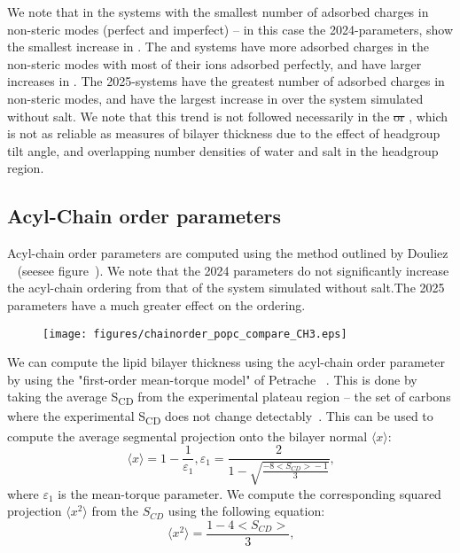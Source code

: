 We note that in the systems with the smallest number of adsorbed charges in non-steric modes (perfect and imperfect) -- in this case the 2024-\mg parameters, show
the smallest increase in \dc{}. The \na and \li systems have more adsorbed charges in the non-steric modes with most of their ions adsorbed perfectly,
and have larger increases in \dc{}. The 2025-\mg systems have the greatest number of adsorbed charges in non-steric modes, and have the largest increase in \dc{} over the system simulated without salt. We note that
this trend is not followed necessarily in the \dhh{} \st{or \db{}}, which is not as reliable as measures of bilayer thickness due to the effect of headgroup tilt angle, and overlapping number densities of water
and salt in the headgroup region.
\subsection{Acyl-Chain order parameters}
Acyl-chain order parameters are computed using the method outlined by Douliez \etal~\cite{Douliez:1995} (seesee  figure~\label{fig:acylorder}). We note that
the 2024 \mg{} parameters do not significantly increase the acyl-chain ordering from that of the system simulated without salt.The 2025 \mg{} parameters have a much greater effect on the ordering.
\begin{figure}[H]
    \caption[Acyl-Chain order parameters]{ }
    \label{fig:acylorder}
    \texttt{[image: figures/chainorder\_popc\_compare\_CH3.eps]}
\end{figure}
We can compute the lipid bilayer thickness using the acyl-chain order parameter by using the
"first-order mean-torque model" of Petrache \etal~\cite{petrache:2000:nmrarea,nagle:2000}.
This is done by taking the average S\textsubscript{CD} from the experimental plateau region -- the set of carbons where the experimental S\textsubscript{CD} does not change
detectably~\cite{nagle:2000,nagle:1993:nmrarea}. This can be used to compute the average segmental projection onto the bilayer normal $\langle x \rangle$:
\begin{equation}
    \langle x \rangle = 1 - \frac{1}{\varepsilon_1}, \varepsilon_1 = \frac{2}{1 - \sqrt{\frac{-8\big<S_{CD}\big> - 1}{3}}}\text{,}
\end{equation}
where $\varepsilon_1$ is the mean-torque parameter. We compute the corresponding squared projection $\langle x^2 \rangle$ from the $S_{CD}$
using the following equation:
\begin{equation}
    \langle x^2 \rangle = \frac{1 - 4\big<S_{CD}\big>}{3}\text{,}
\end{equation}

